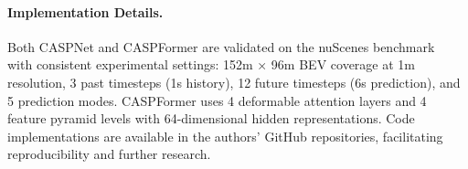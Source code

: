 \paragraph{Implementation Details.} Both CASPNet and CASPFormer are validated on the nuScenes benchmark~\cite{nuscene2020prediction} with consistent experimental settings: 152m × 96m BEV coverage at 1m resolution, 3 past timesteps (1s history), 12 future timesteps (6s prediction), and 5 prediction modes. CASPFormer uses 4 deformable attention layers and 4 feature pyramid levels with 64-dimensional hidden representations. Code implementations are available in the authors' GitHub repositories, facilitating reproducibility and further research.